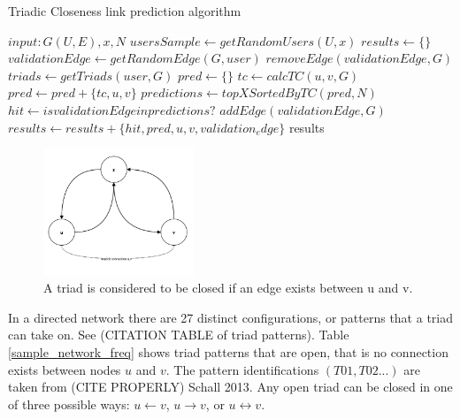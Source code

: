 \begin{algorithm}
\caption{Triadic Closeness link prediction algorithm}\label{algo_tc}
\begin{algorithmic}[1]
\State $input: G(U, E), x, N$ 
\State $usersSample \gets getRandomUsers(U,x)$
\State $results \gets \{\}$
	\State $validationEdge \gets getRandomEdge(G, user)$
	\State $removeEdge(validationEdge,G)$
	\State $triads \gets getTriads(user, G)$
	\State $pred \gets \{\}$
		\State $tc \gets calcTC(u,v,G)$
		\State $pred \gets pred + \{tc, u, v\}$
	\EndFor
	\State $predictions \gets topXSortedByTC(pred, N)$
	\State $hit \gets is validationEdge in predictions?$
	\State $addEdge(validationEdge, G)$
	\State $results \gets results + \{hit, pred, u, v, validation_edge\}$
\EndFor
\State \Return results
\end{algorithmic}
\end{algorithm}


\begin{figure}[H]
  \centering
  \includegraphics[width=0.4\textwidth]{images/thesis_triad_example.png}
  \caption[closed triad patterns]{A triad is considered to be closed if an edge exists between u and v.}
  \label{thesis_closed_triads}
\end{figure}


In a directed network there are 27 distinct configurations, or patterns that a triad can take on. See (CITATION TABLE of triad patterns). Table \ref{sample_network_freq} shows triad patterns that are open, that is no connection exists between nodes $u$ and $v$. The pattern identifications $(T01, T02...)$ are taken from (CITE PROPERLY) Schall 2013. Any open triad can be closed in one of three possible ways: $u \leftarrow v$, $u \rightarrow v$, or $u \leftrightarrow v$.

